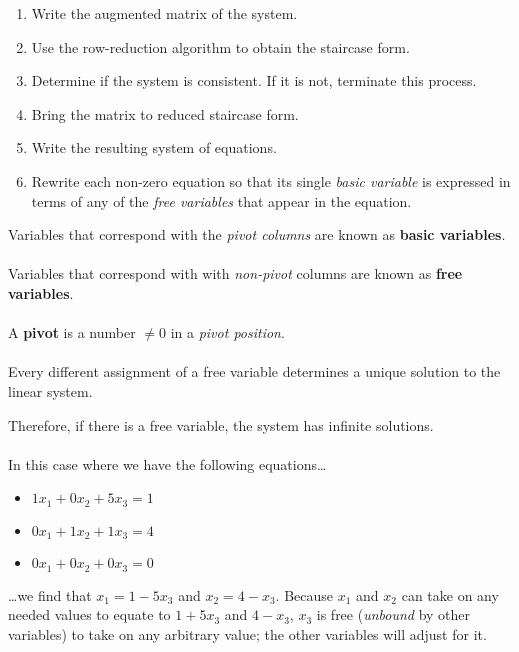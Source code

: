 \documentclass[12pt]{article}
\begin{document}
\begin{enumerate}
    \item Write the augmented matrix of the system.
    \item Use the row-reduction algorithm to obtain the staircase form.
    \item Determine if the system is consistent. If it is not, terminate this process.
    \item Bring the matrix to reduced staircase form.
    \item Write the resulting system of equations.
    \item Rewrite each non-zero equation so that its single \emph{basic variable} is expressed in terms of any of the \emph{free variables} that appear in the equation.
\end{enumerate}

Variables that correspond with the \emph{pivot columns} are known as \textbf{basic variables}. \\ \\

Variables that correspond with with \emph{non-pivot} columns are known as \textbf{free variables}. \\ \\

A \textbf{pivot} is a number $\neq 0$ in a \emph{pivot position}. \\ \\

Every different assignment of a free variable determines a unique solution to the linear system.

Therefore, if there is a free variable, the system has infinite solutions. \\ \\

In this case where we have the following equations\dots

\begin{itemize}
    \item $1x_1 + 0x_2 + 5x_3 = 1$
    \item $0x_1 + 1x_2 + 1x_3 = 4$
    \item $0x_1 + 0x_2 + 0x_3 = 0$
\end{itemize}

\dots we find that $x_1 = 1 - 5x_3$ and $x_2 = 4 - x_3$. Because $x_1$ and $x_2$ can take on any needed values to equate to $1 + 5x_3$ and $4 - x_3$,
$x_3$ is free (\emph{unbound} by other variables) to take on any arbitrary value; the other variables will adjust for it.
\end{document}
